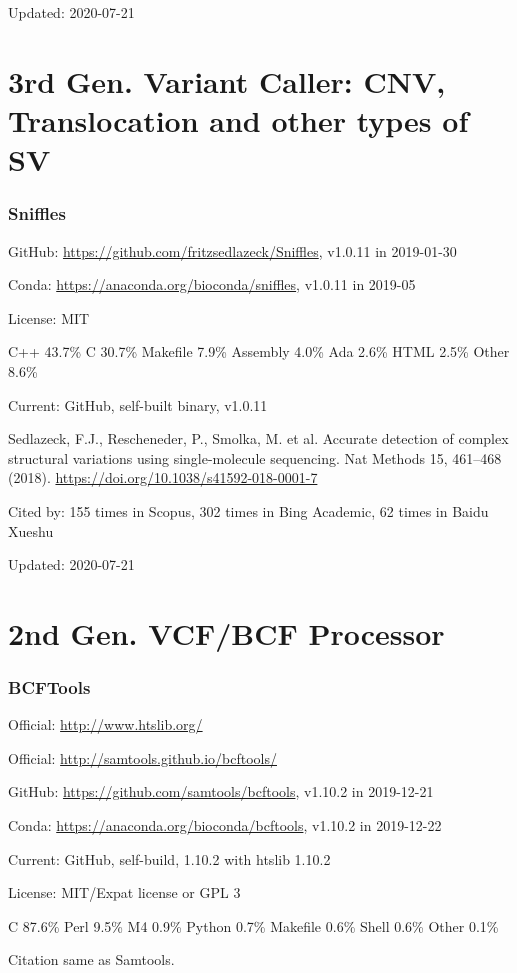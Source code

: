 \documentclass[]{article}
\newcommand{\cb}[3]{\par Cited by: {\color{blue}\Huge #1} times in Scopus, {\color{blue}\Huge #2} times in Bing Academic, {\color{blue}\Huge #3} times in Baidu Xueshu}
\begin{document}
Updated: 2020-07-21

\part{3rd Gen. Variant Caller: CNV, Translocation and other types of SV}

\section{Sniffles}

GitHub: \url{https://github.com/fritzsedlazeck/Sniffles}, v1.0.11 in 2019-01-30

Conda: \url{https://anaconda.org/bioconda/sniffles}, v1.0.11 in 2019-05

License: MIT

C++ 43.7\% C 30.7\% Makefile 7.9\% Assembly 4.0\% Ada 2.6\% HTML 2.5\% Other 8.6\%

Current: GitHub, self-built binary, v1.0.11

Sedlazeck, F.J., Rescheneder, P., Smolka, M. et al. Accurate detection of complex structural variations using single-molecule sequencing. Nat Methods 15, 461–468 (2018). \url{https://doi.org/10.1038/s41592-018-0001-7}\cb{155}{302}{62}

Updated: 2020-07-21

\part{2nd Gen. VCF/BCF Processor}

\section{BCFTools}

Official: \url{http://www.htslib.org/}

Official: \url{http://samtools.github.io/bcftools/}

GitHub: \url{https://github.com/samtools/bcftools}, v1.10.2 in 2019-12-21

Conda: \url{https://anaconda.org/bioconda/bcftools}, v1.10.2 in 2019-12-22

Current: GitHub, self-build, 1.10.2 with htslib 1.10.2

License: MIT/Expat license or GPL 3

C 87.6\% Perl 9.5\% M4 0.9\% Python 0.7\% Makefile 0.6\% Shell 0.6\% Other 0.1\%

Citation same as Samtools.
\end{document}
